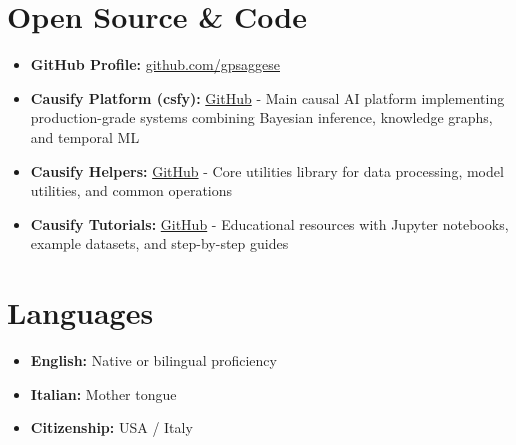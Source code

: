 \documentclass[10pt, letterpaper]{article}
\providecommand{\tightlist}{%
\setlength{\itemsep}{0pt}
\setlength{\parskip}{0pt}}
\begin{document}
  \section{\texorpdfstring{\textbf{Open Source \& Code}}{Open Source \&
  Code}}
  \label{open-source-code}

  \begin{itemize}
    \tightlist

    \item \textbf{GitHub Profile:}
      \href{https://github.com/gpsaggese?tab=activity}{github.com/gpsaggese}

    \item \textbf{Causify Platform (csfy):}
      \href{https://github.com/causify-ai/csfy}{GitHub} - Main causal AI
      platform implementing production-grade systems combining Bayesian
      inference, knowledge graphs, and temporal ML

    \item \textbf{Causify Helpers:}
      \href{https://github.com/causify-ai/helpers}{GitHub} - Core
      utilities library for data processing, model utilities, and common
      operations

    \item \textbf{Causify Tutorials:}
      \href{https://github.com/causify-ai/tutorials}{GitHub} -
      Educational resources with Jupyter notebooks, example datasets,
      and step-by-step guides
  \end{itemize}

  \section{\texorpdfstring{\textbf{Languages}}{Languages}}
  \label{languages}

  \begin{itemize}
    \item \textbf{English:} Native or bilingual proficiency

    \item \textbf{Italian:} Mother tongue

    \item \textbf{Citizenship:} USA / Italy
  \end{itemize}
\end{document}
